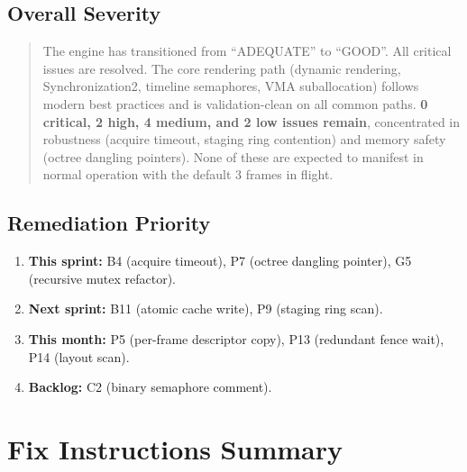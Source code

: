 \documentclass[a4paper,12pt]{article}
\newcommand{\severitybox}[2]{%
  \colorbox{#1}{\makebox[2.5cm][c]{\textcolor{white}{\textbf{#2}}}}%
}
\begin{document}
\subsection*{Overall Severity}

\medskip
\noindent\severitybox{lowcolor}{GOOD}

\begin{quote}
  The engine has transitioned from ``ADEQUATE'' to ``GOOD''. All critical
  issues are resolved. The core rendering path (dynamic rendering,
  Synchronization2, timeline semaphores, VMA suballocation) follows modern best
  practices and is validation-clean on all common paths. \textbf{0 critical,
  2 high, 4 medium, and 2 low issues remain}, concentrated in robustness
  (acquire timeout, staging ring contention) and memory safety (octree
  dangling pointers). None of these are expected to manifest in normal
  operation with the default 3 frames in flight.
\end{quote}

\subsection*{Remediation Priority}

\begin{enumerate}[noitemsep]
  \item[\textbf{P0}] \textbf{This sprint:} B4 (acquire timeout), P7 (octree
        dangling pointer), G5 (recursive mutex refactor).
  \item[\textbf{P1}] \textbf{Next sprint:} B11 (atomic cache write), P9
        (staging ring scan).
  \item[\textbf{P2}] \textbf{This month:} P5 (per-frame descriptor copy), P13
        (redundant fence wait), P14 (layout scan).
  \item[\textbf{P3}] \textbf{Backlog:} C2 (binary semaphore comment).
\end{enumerate}

\newpage

\section{Fix Instructions Summary}
\end{document}
